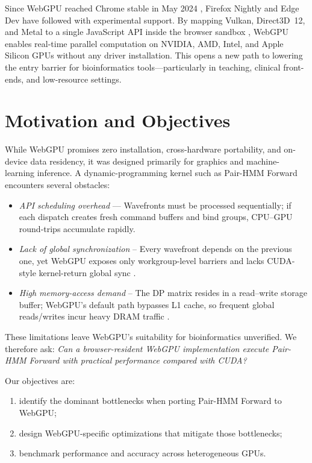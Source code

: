 \documentclass[PhD]{PHlab-thesis}
\begin{document}
Since WebGPU reached Chrome stable in May 2024 \cite{Chrome2024-blog}, Firefox Nightly and Edge Dev have followed with experimental support. By mapping Vulkan, Direct3D~12, and Metal to a single JavaScript API inside the browser sandbox \cite{W3C2024-webgpu}, WebGPU enables real-time parallel computation on NVIDIA, AMD, Intel, and Apple Silicon GPUs without any driver installation. This opens a new path to lowering the entry barrier for bioinformatics tools—particularly in teaching, clinical front-ends, and low-resource settings.

\section{Motivation and Objectives}
While WebGPU promises zero installation, cross-hardware portability, and on-device data residency, it was designed primarily for graphics and machine-learning inference. A dynamic-programming kernel such as Pair-HMM Forward encounters several obstacles:

\begin{itemize}
    \item \textit{API scheduling overhead} — Wavefronts must be processed sequentially; if each dispatch creates fresh command buffers and bind groups, CPU–GPU round-trips accumulate rapidly.
    
  \item \textit{Lack of global synchronization} – Every wavefront depends on the previous one, yet WebGPU exposes only workgroup-level barriers and lacks CUDA-style kernel-return global sync \cite{W3C2024-webgpu}.
  \item \textit{High memory-access demand} – The DP matrix resides in a read–write storage buffer; WebGPU's default path bypasses L1 cache, so frequent global reads/writes incur heavy DRAM traffic \cite{Liu2021-bib}.
\end{itemize}

These limitations leave WebGPU's suitability for bioinformatics unverified. We therefore ask: \textit{Can a browser-resident WebGPU implementation execute Pair-HMM Forward with practical performance compared with CUDA?}

Our objectives are:
\begin{enumerate}
  \item identify the dominant bottlenecks when porting Pair-HMM Forward to WebGPU;
  \item design WebGPU-specific optimizations that mitigate those bottlenecks;
  \item benchmark performance and accuracy across heterogeneous GPUs.
\end{enumerate}
\end{document}
